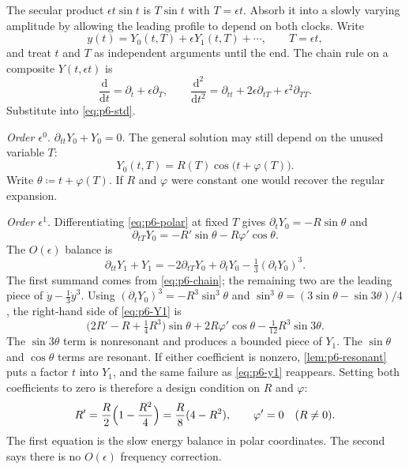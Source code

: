 The secular product \(\epsilon t\sin t\) is \(T\sin t\) with \(T=\epsilon t\). Absorb it into a slowly varying amplitude by allowing the leading profile to depend on both clocks. Write
\begin{equation}
\label{eq:p6-ms-ansatz}
y(t)=Y_0(t,T)+\epsilon Y_1(t,T)+\cdots,
\qquad
T=\epsilon t,
\end{equation}
and treat \(t\) and \(T\) as independent arguments until the end. The chain rule on a composite \(Y(t,\epsilon t)\) is
\begin{equation}
\label{eq:p6-chain}
\frac{\mathrm{d}}{\mathrm{d}t}=\partial_t+\epsilon\partial_T,
\qquad
\frac{\mathrm{d}^2}{\mathrm{d}t^2}=\partial_{tt}+2\epsilon\partial_{tT}+\epsilon^2\partial_{TT}.
\end{equation}
Substitute into \eqref{eq:p6-std}.

\emph{Order \(\epsilon^0\).} \(\partial_{tt}Y_0+Y_0=0\). The general solution may still depend on the unused variable \(T\):
\begin{equation}
\label{eq:p6-polar}
Y_0(t,T)=R(T)\cos\bigl(t+\varphi(T)\bigr).
\end{equation}
Write \(\theta\coloneqq t+\varphi(T)\). If \(R\) and \(\varphi\) were constant one would recover the regular expansion.

\emph{Order \(\epsilon^1\).} Differentiating \eqref{eq:p6-polar} at fixed \(T\) gives \(\partial_t Y_0=-R\sin\theta\) and
\[
\partial_{tT}Y_0=-R'\sin\theta-R\varphi'\cos\theta.
\]
The \(O(\epsilon)\) balance is
\begin{equation}
\label{eq:p6-Y1}
\partial_{tt}Y_1+Y_1
=
-2\partial_{tT}Y_0+\partial_t Y_0-\tfrac13(\partial_t Y_0)^3.
\end{equation}
The first summand comes from \eqref{eq:p6-chain}; the remaining two are the leading piece of \(\dot y-\frac13\dot y^3\). Using \((\partial_t Y_0)^3=-R^3\sin^3\theta\) and \(\sin^3\theta=(3\sin\theta-\sin 3\theta)/4\), the right-hand side of \eqref{eq:p6-Y1} is
\begin{equation}
\label{eq:p6-Y1-rhs}
\bigl(2R'-R+\tfrac14 R^3\bigr)\sin\theta
+
2R\varphi'\cos\theta
-
\tfrac{1}{12}R^3\sin 3\theta.
\end{equation}
The \(\sin 3\theta\) term is nonresonant and produces a bounded piece of \(Y_1\). The \(\sin\theta\) and \(\cos\theta\) terms are resonant. If either coefficient is nonzero, \cref{lem:p6-resonant} puts a factor \(t\) into \(Y_1\), and the same failure as \eqref{eq:p6-y1} reappears. Setting both coefficients to zero is therefore a design condition on \(R\) and \(\varphi\):
\begin{equation}
\label{eq:p6-amp}
R'
=
\frac{R}{2}\Bigl(1-\frac{R^2}{4}\Bigr)
=
\frac{R}{8}(4-R^2),
\qquad
\varphi'=0
\quad(R\neq 0).
\end{equation}
The first equation is the slow energy balance in polar coordinates. The second says there is no \(O(\epsilon)\) frequency correction.

